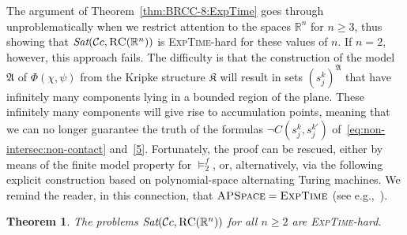 \documentclass{LMCS}
\theoremstyle{plain}
\newtheorem{theorem}[thm]{Theorem}
\newcommand{\cBC}{\ensuremath{\mathcal{C}}}
\newcommand{\cBCc}{\ensuremath{\cBC{}c}} \newcommand{\cBCcc}{\ensuremath{\cBC{}cc}}
\newcommand{\fA}{\mathfrak{A}}\newcommand{\fB}{\mathfrak{B}}\newcommand{\fM}{\mathfrak{M}}\newcommand{\cK}{\mathcal{K}}\newcommand{\R}{\mathbb{R}}\newcommand{\cR}{\mathcal{R}}\newcommand{\cL}{\mathcal{L}}\newcommand{\cLc}{\mathcal{L}c}\newcommand{\cLcc}{\mathcal{L}cc}
\newcommand{\Sat}{\textit{Sat}}
\newcommand{\ExpTime}{\textsc{ExpTime}}
\begin{document}
The argument of Theorem~\ref{thm:BRCC-8:ExpTime} goes through
unproblematically when we restrict attention to the spaces $\R^n$ for
$n \geq 3$, thus showing that $\Sat( \cBCc , \RegC(\R^n))$ is
\ExpTime{}-hard for these values of $n$.  If $n=2$, however, this
approach fails.  The difficulty is that the construction of the model
$\fA$ of $\Phi(\chi,\psi)$ from the Kripke structure $\mathfrak K$
will result in sets $(s_j^k)^\fA$ that have infinitely many components
lying in a bounded region of the plane. These infinitely many
components will give rise to accumulation points, meaning that we can
no longer guarantee the truth of the formulas $\neg C(s_j^k,
s_j^{k'})$ of~\eqref{eq:non-intersec:non-contact} and~\eqref{5}.
Fortunately, the proof can be rescued, either by means of the finite
model property for $\models_2^f$, or, alternatively, via the
following explicit construction based on polynomial-space alternating
Turing machines. We remind the reader, in this connection, that
$\textsc{APSpace} = \textsc{ExpTime}$ (see
e.g.,~\cite{Kozen06}).
\begin{theorem}\label{thm:BRCC-8:ExpTime:bis}
The problems $\Sat( \cBCc , \RegC(\R^n))$ for all $n \geq 2$
are \ExpTime{}-hard.
\end{theorem}
\end{document}
